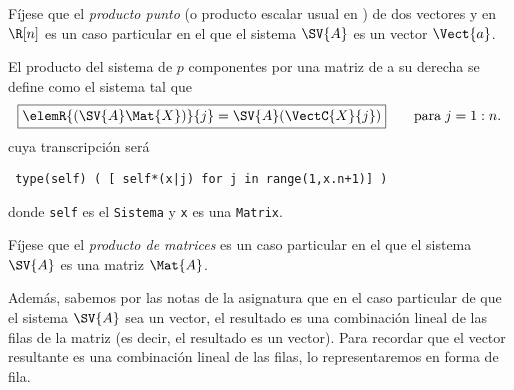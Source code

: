\documentclass[11pt]{report}
\begin{document}
Fíjese que el \emph{producto punto} (o producto escalar usual en \R[n]) de
dos vectores  y  en \(\R[n]\) es un caso particular en
el que el sistema \(\SV{A}\) es un vector \(\Vect{a}\).

El producto del sistema  de \(p\) componentes por una matriz
 de \R[n] a su derecha se define como el sistema tal
que
\begin{displaymath}
  \fbox{$\elemR{(\SV{A}\Mat{X})}{j}=\SV{A}(\VectC{X}{j})$}
  \qquad\text{para}\; j=1:n.
\end{displaymath}
cuya transcripción será
\begin{center}
  \Verb/ type(self) ( [ self*(x|j) for j in range(1,x.n+1)] ) /
\end{center}
donde \texttt{self} es el \texttt{Sistema} y \texttt{x} es una \texttt{Matrix}.

Fíjese que el \emph{producto de matrices} es un caso particular en el que
el sistema \(\SV{A}\) es una matriz \(\Mat{A}\).

Además, sabemos por las notas de la asignatura que en el caso
particular de que el sistema \(\SV{A}\) sea un vector, el resultado es
una combinación lineal de las filas de la matriz  (es decir, el
resultado es un vector). Para recordar que el vector resultante es una
combinación lineal de las filas, lo representaremos en forma de fila.
\end{document}
